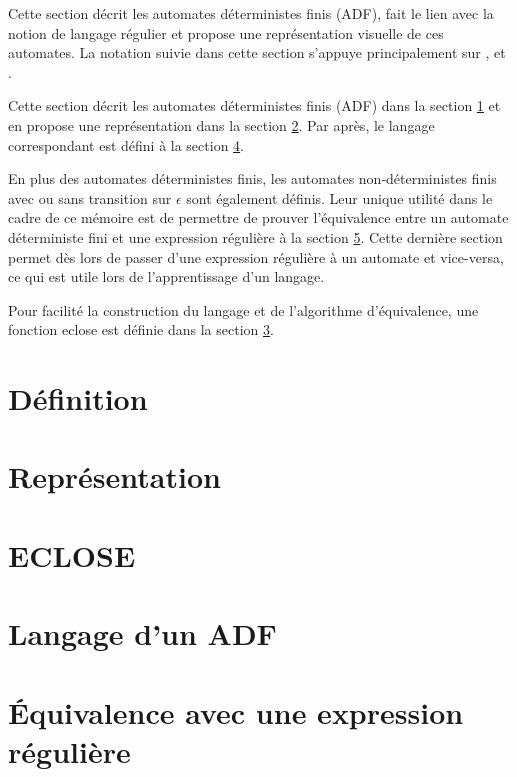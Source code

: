 Cette section décrit les automates déterministes finis (ADF), fait le lien avec la notion de langage régulier et propose une représentation visuelle de ces automates. La notation suivie dans cette section s'appuye principalement sur \cite{Hopcroft79}, \cite{Hopcroft00} et \cite{Kozen97}.

Cette section décrit les automates déterministes finis (ADF) dans la section \ref{adf:def} et en propose une représentation dans la section \ref{adf:repr}. Par après, le langage correspondant est défini à la section \ref{adf:lang}.

En plus des automates déterministes finis, les automates non-déterministes finis avec ou sans transition sur $\epsilon$ sont également définis. Leur unique utilité dans le cadre de ce mémoire est de permettre de prouver l'équivalence entre un automate déterministe fini et une expression régulière à la section \ref{adf:eq}. Cette dernière section permet dès lors de passer d'une expression régulière à un automate et vice-versa, ce qui est utile lors de l'apprentissage d'un langage.

Pour facilité la construction du langage et de l'algorithme d'équivalence, une fonction eclose est définie dans la section \ref{adf:eclose}.


\section{Définition}\label{adf:def}
\section{Représentation}\label{adf:repr}
\section{ECLOSE}\label{adf:eclose}
\section{Langage d'un ADF}\label{adf:lang}
\section{Équivalence avec une expression régulière}\label{adf:eq}
